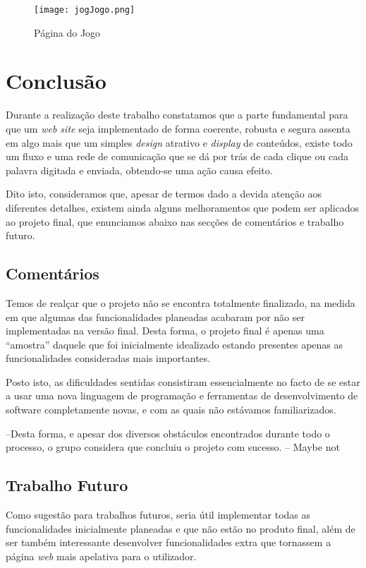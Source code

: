 \documentclass[11pt,a4paper]{report}
\begin{document}
\begin{figure}[h]
    \centering
    \texttt{[image: jogJogo.png]}
    \caption{Página do Jogo}
    \label{fig:jogJogo}
\end{figure}

\chapter{Conclusão}

Durante a realização deste trabalho constatamos que a parte fundamental para que um \emph{web site} seja implementado de forma coerente, robusta e segura assenta em algo mais que um simples \emph{design} atrativo e \emph{display} de conteúdos, existe todo um fluxo e uma rede de comunicação que se dá por trás de cada clique ou cada palavra digitada e enviada, obtendo-se uma ação causa efeito.

Dito isto, consideramos que, apesar de termos dado a devida atenção aos diferentes detalhes, existem ainda alguns melhoramentos que podem ser aplicados ao projeto final, que enunciamos abaixo nas secções de comentários e trabalho futuro.

\section{Comentários}

Temos de realçar que o projeto não se encontra totalmente finalizado, na medida em que algumas das funcionalidades planeadas acabaram por não ser implementadas na versão final. Desta forma, o projeto final é apenas uma “amostra” daquele que foi inicialmente idealizado estando presentes apenas as funcionalidades consideradas mais importantes.

Posto isto, as dificuldades sentidas consistiram essencialmente no facto de se estar a usar uma nova linguagem de programação e ferramentas de desenvolvimento de software completamente novas, e com as quais não estávamos familiarizados.

--Desta forma, e apesar dos diversos obstáculos encontrados durante todo o processo, o grupo considera que concluiu o projeto com sucesso. -- Maybe not

\section{Trabalho Futuro}

Como sugestão para trabalhos futuros, seria útil implementar todas as funcionalidades inicialmente planeadas e que não estão no produto final, além de ser também interessante desenvolver funcionalidades extra que tornassem a página \emph{web} mais apelativa para o utilizador.
\end{document}
